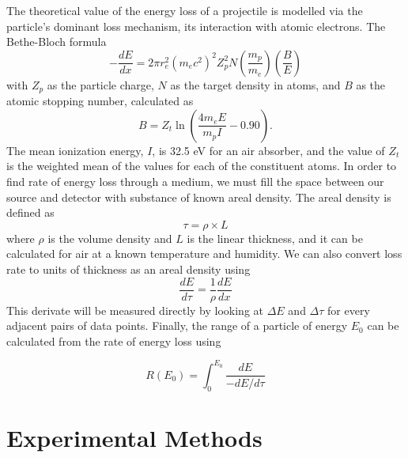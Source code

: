 \documentclass[12pt]{article}
\begin{document}
\begin{multicols}{2}
    The theoretical value of the energy loss of a projectile is modelled via the particle's dominant loss mechanism, its interaction with atomic electrons. The Bethe-Bloch formula
    \begin{equation}
        -\frac{dE}{dx} = 2\pi r_e^2(m_ec^2)^2Z_p^2N\left(\frac{m_p}{m_e}\right)\left(\frac{B}{E}\right)
        \label{bethebloch}
    \end{equation}
    with $Z_p$ as the particle charge, $N$ as the target density in atoms, and $B$ as the atomic stopping number, calculated as
    $$B = Z_t\ln\left(\frac{4m_eE}{m_pI} - 0.90\right).$$
    The mean ionization energy, $I$, is 32.5 eV for an air absorber, and the value of $Z_t$ is the weighted mean of the values for each of the constituent atoms.
    In order to find rate of energy loss through a medium, we must fill the space between our source and detector with substance of known areal density. The areal density is defined as
    \begin{equation}
        \tau = \rho \times L
        \label{areal}
    \end{equation}
    where $\rho$ is the volume density and $L$ is the linear thickness, and it can be calculated for air at a known temperature and humidity. We can also convert loss rate to units of thickness as an areal density using 
    \begin{equation}
        \frac{dE}{d\tau} = \frac{1}{\rho}\frac{dE}{dx}
        \label{arealConversion}
    \end{equation}
    This derivate will be measured directly by looking at $\Delta E$ and $\Delta \tau$ for every adjacent pairs of data points.
    Finally, the range of a particle of energy $E_0$ can be calculated from the rate of energy loss using 
    
    \begin{equation}
        R(E_0) = \int_0^{E_0} \frac{dE}{-dE/d\tau}
        \label{range}
    \end{equation}

    \section{Experimental Methods}


\end{multicols}
\end{document}
